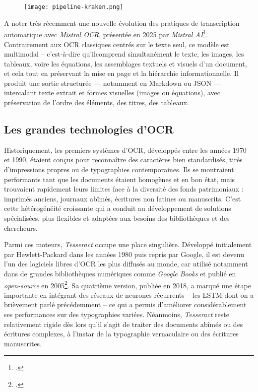 \begin{figure}[htbp]
\centering
\texttt{[image: pipeline-kraken.png]}
\caption{}
\label{fig:pipeline-kraken}
\end{figure}

A noter très récemment une nouvelle évolution des pratiques de transcription automatique avec \emph{Mistral OCR}, présentée en 2025 par \emph{Mistral AI}\footcite[][]{mistralocr}. Contrairement aux OCR classiques centrés sur le texte seul, ce modèle est multimodal -- c'est-à-dire qu'ilcomprend simultanément le texte, les images, les tableaux, voire les équations, les assemblages textuels et visuels d’un document, et cela tout en préservant la mise en page et la hiérarchie informationnelle. Il produit une sortie structurée — notamment en Markdown ou JSON — intercalant texte extrait et formes visuelles (images ou équations), avec préservation de l’ordre des éléments, des titres, des tableaux.

\subsection{Les grandes technologies d'OCR}

Historiquement, les premiers systèmes d’OCR, développés entre les années 1970 et 1990, étaient conçus pour reconnaître des caractères bien standardisés, tirés d’impressions propres ou de typographies contemporaines. Ils se montraient performants tant que les documents étaient homogènes et en bon état, mais trouvaient rapidement leurs limites face à la diversité des fonds patrimoniaux : imprimés anciens, journaux abîmés, écritures non latines ou manuscrits. C’est cette hétérogénéité croissante qui a conduit au développement de solutions spécialisées, plus flexibles et adaptées aux besoins des bibliothèques et des chercheurs.

Parmi ces moteurs, \emph{Tesseract} occupe une place singulière. Développé initialement par Hewlett-Packard dans les années 1980 puis repris par Google, il est devenu l’un des logiciels libres d’OCR les plus diffusés au monde, car utilisé notamment dans de grandes bibliothèques numériques comme \emph{Google Books} et publié en \emph{open-source} en 2005\footcite[][]{smith}. Sa quatrième version, publiée en 2018, a marqué une étape importante en intégrant des réseaux de neurones récurrents -- les LSTM dont on a brièvement parlé précédemment -- ce qui a permis d’améliorer considérablement ses performances sur des typographies variées. Néanmoins, \emph{Tesseract} reste relativement rigide dès lors qu’il s’agit de traiter des documents abîmés ou des écritures complexes, à l'instar de la typographie vernaculaire ou des écritures manuscrites.

